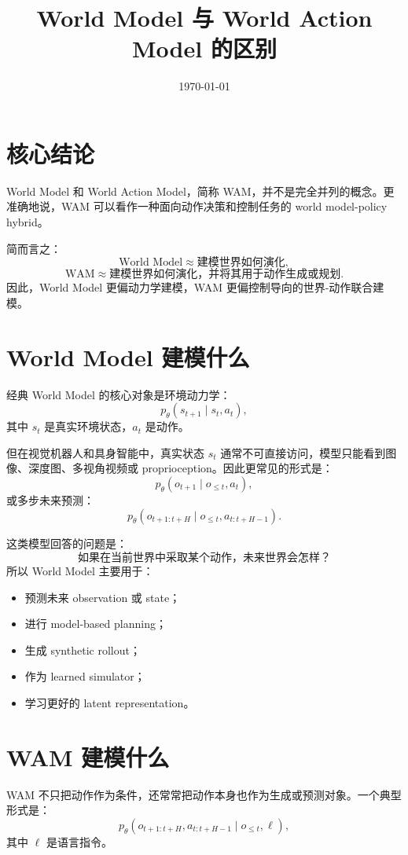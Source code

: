 \documentclass[11pt,a4paper]{ctexart}
\title{World Model 与 World Action Model 的区别}
\author{}
\date{\today}
\begin{document}
\maketitle

\section{核心结论}

World Model 和 World Action Model，简称 WAM，并不是完全并列的概念。更准确地说，WAM 可以看作一种面向动作决策和控制任务的 world model-policy hybrid。

简而言之：
\[
  \text{World Model} \approx \text{建模世界如何演化},
\]
\[
  \text{WAM} \approx \text{建模世界如何演化，并将其用于动作生成或规划}.
\]
因此，World Model 更偏动力学建模，WAM 更偏控制导向的世界-动作联合建模。

\section{World Model 建模什么}

经典 World Model 的核心对象是环境动力学：
\[
  p_\theta(s_{t+1}\mid s_t,a_t),
\]
其中 $s_t$ 是真实环境状态，$a_t$ 是动作。

但在视觉机器人和具身智能中，真实状态 $s_t$ 通常不可直接访问，模型只能看到图像、深度图、多视角视频或 proprioception。因此更常见的形式是：
\[
  p_\theta(o_{t+1}\mid o_{\le t},a_t),
\]
或多步未来预测：
\[
  p_\theta(o_{t+1:t+H}\mid o_{\le t},a_{t:t+H-1}).
\]

这类模型回答的问题是：
\[
  \text{如果在当前世界中采取某个动作，未来世界会怎样？}
\]
所以 World Model 主要用于：
\begin{itemize}
  \item 预测未来 observation 或 state；
  \item 进行 model-based planning；
  \item 生成 synthetic rollout；
  \item 作为 learned simulator；
  \item 学习更好的 latent representation。
\end{itemize}

\section{WAM 建模什么}

WAM 不只把动作作为条件，还常常把动作本身也作为生成或预测对象。一个典型形式是：
\[
  p_\theta(o_{t+1:t+H},a_{t:t+H-1}\mid o_{\le t},\ell),
\]
其中 $\ell$ 是语言指令。
\end{document}
